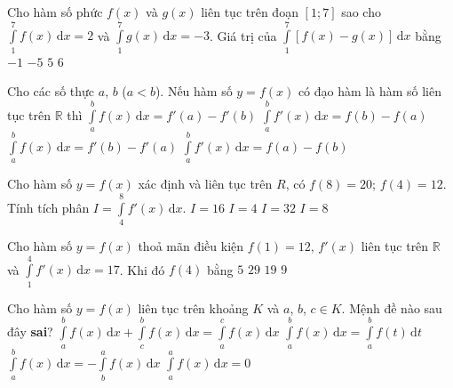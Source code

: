 \begin{ex}%
	Cho hàm số phức $f(x)$ và $g(x)$ liên tục trên đoạn $[1; 7]$ sao cho $\displaystyle\int\limits_1^7{f(x)\mathrm{\,d}x}=2$ và $\displaystyle\int\limits_1^7{g(x)\mathrm{\,d}x}=-3$. Giá trị của $\displaystyle\int\limits_1^7{[ f(x)-g(x) ]\mathrm{\,d}x}$ bằng
	\choice
	{$-1$}
	{$-5$}
	{\True $5$}
	{$6$}
\end{ex}
\begin{ex}%
	Cho các số thực $a$, $b$ ($a < b$). Nếu hàm số $y = f(x)$ có đạo hàm là hàm số liên tục trên $\mathbb{R}$ thì
	\choice
	{ $\displaystyle\int\limits_a^b f(x)\mathrm{\,d}x = f'(a) - f'(b)$}
	{\True $\displaystyle\int\limits_a^b f'(x)\mathrm{\,d}x = f(b) - f(a)$}
	{ $\displaystyle\int\limits_a^b f(x)\mathrm{\,d}x = f'(b) - f'(a)$}
	{ $\displaystyle\int\limits_a^b f'(x)\mathrm{\,d}x = f(a) - f(b)$}
\end{ex}
\begin{ex}%
	Cho hàm số $y = f(x)$ xác định và liên tục trên $R$, có $f(8) = 20$; $f(4) = 12$. Tính tích phân $I = \displaystyle\int\limits_4^8 f'(x)\mathrm{\,d}x$.
	\choice
	{$I=16$}
	{$I=4$}
	{$I=32$}
	{\True $I=8$}
\end{ex}
\begin{ex}%
	Cho hàm số $y = f(x)$ thoả mãn điều kiện $f(1) = 12$, $f'(x)$ liên tục trên $\mathbb{R}$ và $\displaystyle\int\limits_1^4 f'(x)\mathrm{\,d}x = 17$. Khi đó $f(4)$ bằng
	\choice
	{$5$}
	{\True $29$}
	{$19$}
	{$9$}
\end{ex}
\begin{ex}%
	Cho hàm số $y = f(x)$ liên tục trên khoảng $K$ và $a$, $b$, $c \in K$. Mệnh đề nào sau đây \textbf{sai}?
	\choice
	{\True $\displaystyle\int\limits_a^b f(x)\mathrm{\,d}x + \displaystyle\int\limits_c^b f(x)\mathrm{\,d}x = \displaystyle\int\limits_a^c f(x)\mathrm{\,d}x$}
	{$\displaystyle\int\limits_a^b f(x)\mathrm{\,d}x = \displaystyle\int\limits_a^b f(t)\mathrm{\,d}t$}
	{$\displaystyle\int\limits_a^b f(x)\mathrm{\,d}x = -\displaystyle\int\limits_b^a f(x)\mathrm{\,d}x$}
	{$\displaystyle\int\limits_a^a f(x)\mathrm{\,d}x = 0$}
\end{ex}
